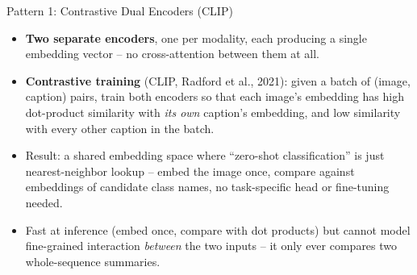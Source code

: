 \begin{vbframe}{Pattern 1: Contrastive Dual Encoders (CLIP)}
\begin{center}
\end{center}
\begin{itemize}
  \item \textbf{Two separate encoders}, one per modality, each producing a single embedding vector -- no cross-attention between them at all.
  \item \textbf{Contrastive training} (CLIP, Radford et al., 2021): given a batch of (image, caption) pairs, train both encoders so that each image's embedding has high dot-product similarity with \emph{its own} caption's embedding, and low similarity with every other caption in the batch.
  \item Result: a shared embedding space where ``zero-shot classification'' is just nearest-neighbor lookup -- embed the image once, compare against embeddings of candidate class names, no task-specific head or fine-tuning needed.
  \item Fast at inference (embed once, compare with dot products) but cannot model fine-grained interaction \emph{between} the two inputs -- it only ever compares two whole-sequence summaries.
\end{itemize}
\end{vbframe}

